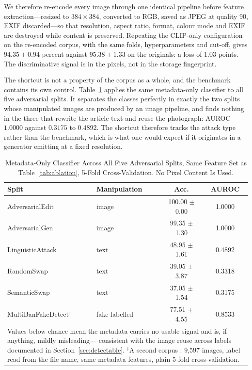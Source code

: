 \documentclass[journal]{IEEEtran}
\begin{document}
We therefore re-encode every image through one identical pipeline before
feature extraction---resized to $384 \times 384$, converted to RGB, saved as
JPEG at quality 90, EXIF discarded---so that resolution, aspect ratio, format,
colour mode and EXIF are destroyed while content is preserved. Repeating the
CLIP-only configuration on the re-encoded corpus, with the same folds,
hyperparameters and cut-off, gives $94.35 \pm 0.94$ percent against
$95.38 \pm 1.33$ on the originals: a loss of $1.03$ points. The discriminative
signal is in the pixels, not in the storage fingerprint.

The shortcut is not a property of the corpus as a whole, and the benchmark
contains its own control. Table~\ref{tab:shortcut} applies the same
metadata-only classifier to all five adversarial splits. It separates the
classes perfectly in exactly the two splits whose manipulated images are
produced by an image pipeline, and finds nothing in the three that rewrite the
article text and reuse the photograph: AUROC $1.0000$ against $0.3175$ to
$0.4892$. The shortcut therefore tracks the attack type rather than the
benchmark, which is what one would expect if it originates in a generator
emitting at a fixed resolution.

\begin{table}[!tb]
\caption{Metadata-Only Classifier Across All Five Adversarial Splits, Same
Feature Set as Table~\ref{tab:ablation}, 5-Fold Cross-Validation. No Pixel
Content Is Used.}
\label{tab:shortcut}
\centering
\setlength{\tabcolsep}{4pt}
\footnotesize
\begin{tabular}{llcc}
\toprule
\textbf{Split} & \textbf{Manipulation} & \textbf{Acc.} & \textbf{AUROC} \\
\midrule
AdversarialEdit  & image & 100.00 $\pm$ 0.00 & 1.0000 \\
AdversarialGen   & image & 99.35 $\pm$ 1.30 & 1.0000 \\
\midrule
LinguisticAttack & text  & 48.95 $\pm$ 1.61 & 0.4892 \\
RandomSwap       & text  & 39.05 $\pm$ 3.87 & 0.3318 \\
SemanticSwap     & text  & 37.05 $\pm$ 1.54 & 0.3175 \\
\midrule
MultiBanFakeDetect$^{\ddagger}$ & fake-labelled & 77.51 $\pm$ 4.55 & 0.8533 \\
\bottomrule
\multicolumn{4}{p{0.92\columnwidth}}{\footnotesize Values below chance mean the
metadata carries no usable signal and is, if anything, mildly misleading---
consistent with the image reuse across labels documented in
Section~\ref{sec:detectable}. $^{\ddagger}$A second corpus
\cite{multibanfake}: 9{,}597 images, label read from the file name, same
metadata features, plain 5-fold cross-validation.}
\end{tabular}
\end{table}
\end{document}
